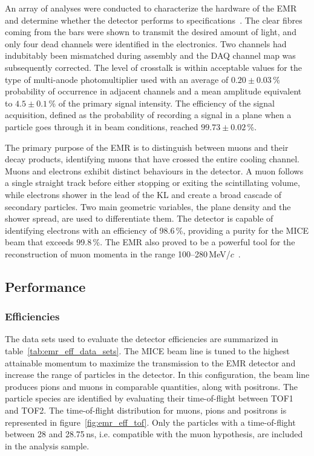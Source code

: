An array of analyses were conducted to characterize the hardware of the EMR and determine whether the detector performs to specifications~\cite{Drielsma:2017doj}. The clear fibres coming from the bars were shown to transmit the desired amount of light, and only four dead channels were identified in the electronics. Two channels had indubitably been mismatched during assembly and the DAQ channel map was subsequently corrected. The level of crosstalk is within acceptable values for the type of multi-anode photomultiplier used with an average of $0.20\pm0.03$\,\% probability of occurrence in adjacent channels and a mean amplitude equivalent to $4.5\pm0.1$\,\% of the primary signal intensity. The efficiency of the signal acquisition, defined as the probability of recording a signal in a plane when a particle goes through it in beam conditions, reached $99.73\pm0.02$\,\%.

The primary purpose of the EMR is to distinguish between muons and their decay products, identifying
muons that have crossed the entire cooling channel. Muons and electrons exhibit distinct behaviours in the detector. A muon follows a single straight track before either stopping or exiting the scintillating volume, while electrons shower in the lead of the KL and create a broad cascade of secondary particles. Two main geometric variables, the plane density and the shower spread, are used to differentiate them. The detector is capable of identifying electrons with an efficiency of 98.6\,\%, providing a purity for the MICE beam that exceeds 99.8\,\%. The EMR also proved to be a powerful tool for the reconstruction of muon momenta in the range 100--280\,MeV/$c$~\cite{2015JInst..10P2012A}.

\subsection{Performance}
\label{SubSect:EMR_Performance}

\subsubsection{Efficiencies}
The data sets used to evaluate the detector efficiencies are summarized in table~\ref{tab:emr_eff_data_sets}. The MICE beam line is tuned to the highest attainable momentum to maximize the transmission to the EMR detector and increase the range of particles in the detector. In this configuration, the beam line produces pions and muons in comparable quantities, along with positrons. The particle species are identified by evaluating their time-of-flight between TOF1 and TOF2. The time-of-flight distribution for muons, pions and positrons is represented in figure~\ref{fig:emr_eff_tof}. Only the particles with a time-of-flight between 28 and 28.75\,ns, i.e. compatible with the muon hypothesis, are included in the analysis sample.

